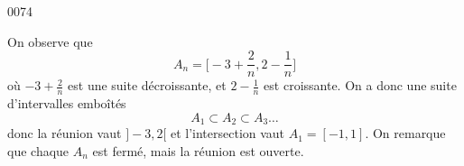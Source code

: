 
\begin{corrige}{0074}

On observe que
\[
	A_n = \Big[-3 + \frac2n,2 - \frac1n\Big]
\]
où $-3+\frac2n$ est une suite décroissante, et $2 - \frac1n$ est croissante. On a donc une suite d'intervalles emboîtés
\[
	A_1 \subset A_2 \subset A_3 \ldots
\]
donc la réunion vaut $]-3, 2[$ et l'intersection vaut $A_1 = [-1,1]$. On remarque que chaque $A_n$ est fermé, mais la réunion est ouverte.


\end{corrige}
